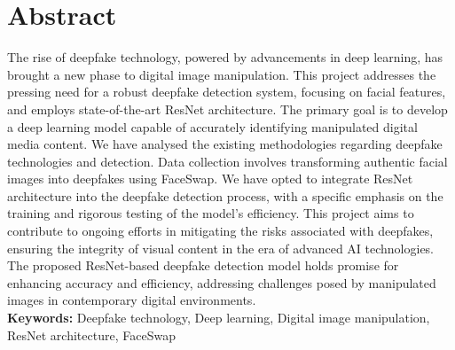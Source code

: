 \chapter*{Abstract}
The rise of deepfake technology, powered by advancements in deep learning, has brought a new phase to digital image manipulation. This project addresses the pressing need for a robust deepfake detection system, focusing on facial features, and employs state-of-the-art ResNet architecture. The primary goal is to develop a deep learning model capable of accurately identifying manipulated digital media content. We have analysed the existing methodologies regarding deepfake technologies and detection. Data collection involves transforming authentic facial images into deepfakes using FaceSwap. We have opted to integrate ResNet architecture into the deepfake detection process, with a specific emphasis on the training and rigorous testing of the model's efficiency. This project aims to contribute to ongoing efforts in mitigating the risks associated with deepfakes, ensuring the integrity of visual content in the era of advanced AI technologies. The proposed ResNet-based deepfake detection model holds promise for enhancing accuracy and efficiency, addressing challenges posed by manipulated images in contemporary digital environments.\\



\textbf{Keywords: }Deepfake technology, Deep learning, Digital image manipulation, ResNet architecture, FaceSwap
